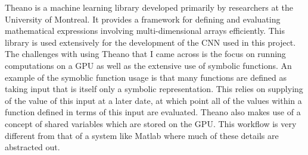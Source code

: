 \documentclass[12pt, titlepage]{article}
\begin{document}
  Theano is a machine learning library developed primarily by researchers at the University of Montreal. It provides a framework for defining
  and evaluating mathematical expressions involving multi-dimensional arrays efficiently. This library is used extensively for the development
  of the CNN used in this project. The challenges with using Theano that I came across is the focus on running computations on a GPU as well as
  the extensive use of symbolic functions. An example of the symoblic function usage is that many functions are defined as taking input that is
  itself only a symbolic representation. This relies on supplying of the value of this input at a later date, at which point all of the values
  within a function defined in terms of this input are evaluated. Theano also makes use of a concept of shared variables which are stored on the
  GPU. This workflow is very different from that of a system like Matlab where much of these details are abstracted out.
\end{document}
